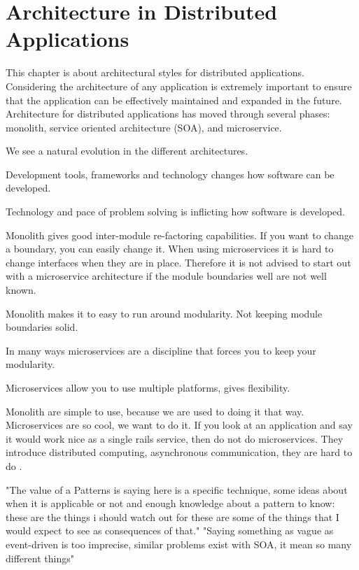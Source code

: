 \chapter{Architecture in Distributed Applications}
\label{ch:architecture}

This chapter is about architectural styles for distributed applications. Considering the architecture of any application is extremely important to ensure that the application can be effectively maintained and expanded in the future. Architecture for distributed applications has moved through several phases: monolith, service oriented architecture (SOA), and microservice.

We see a natural evolution in the different architectures. 

Development tools, frameworks and technology changes how software can be developed.

Technology and pace of problem solving is inflicting how software is developed.


Monolith gives good inter-module re-factoring capabilities. If you want to change a boundary, you can easily change it. When using microservices it is hard to change interfaces when they are in place. Therefore it is not advised to start out with a microservice architecture if the module boundaries well are not well known.

Monolith makes it to easy to run around modularity. Not keeping module boundaries solid. 

In many ways microservices are a discipline that forces you to keep your modularity.

Microservices allow you to use multiple platforms, gives flexibility. 

Monolith are simple to use, because we are used to doing it that way. Microservices are so cool, we want to do it. If you look at an application and say it would work nice as a single rails service, then do not do microservices. They introduce distributed computing, asynchronous communication, they are hard to do \cite{fowler2014microservicesoamonolith}.


\cite{fowler2017what} "The value of a Patterns is saying here is a specific technique, some ideas about when it is applicable or not and enough knowledge about a pattern to know: these are the things i should watch out for these are some of the things that I would expect to see as consequences of that."
"Saying something as vague as event-driven is too imprecise, similar problems exist with SOA, it mean so many different things"

